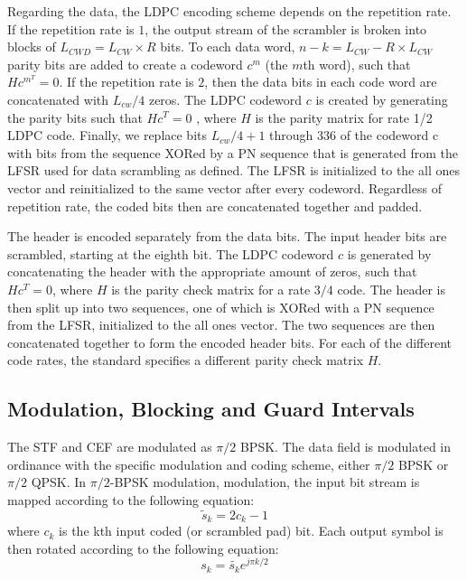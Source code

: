 \documentclass[conference]{IEEEtran}
\begin{document}
Regarding the data, the LDPC encoding scheme depends on the repetition rate. If the repetition rate is $1$, the output stream of the scrambler is broken into blocks of $L_{CWD} = L_{CW} \times R$ bits. To each data word, $n-k=L_{CW} - R \times L_{CW}$ parity bits are added to create a codeword $c^{m}$ (the $m$th word), such that $Hc^{m^{T}} = 0$. If the repetition rate is $2$, then the data bits in each code word are concatenated with $L_{cw}/4$ zeros. The LDPC codeword $c$ is created by generating the parity bits  such that $Hc^T = 0$ , where $H$ is the parity matrix
for rate 1/2 LDPC code. Finally, we replace bits $L_{cw}/4 + 1$ through 336 of the codeword c with bits from the sequence XORed by a PN sequence that is generated from the LFSR used for data
scrambling as defined. The LFSR is initialized to the all ones vector and reinitialized to the same vector after every codeword. Regardless of repetition rate, the coded bits then are concatenated together and padded. 

The header is encoded separately from the data bits. The input header bits are scrambled, starting at the eighth bit. The LDPC codeword $c$ is generated by concatenating the header with the appropriate amount of zeros, such that $Hc^T = 0$, where $H$ is the parity check matrix for a rate $3/4$ code. The header is then split up into two sequences, one of which is XORed with a PN sequence from the LFSR, initialized to the all ones vector. The two sequences are then concatenated together to form the encoded header bits. For each of the different code rates, the standard specifies a different parity check matrix $H$.

\subsection{Modulation, Blocking and Guard Intervals} 
The STF and CEF are modulated as $\pi/2$ BPSK. The data field is modulated in ordinance with the specific modulation and coding scheme, either $\pi/2$ BPSK or $\pi/2$ QPSK. 
In $\pi/2$-BPSK modulation, modulation, the input bit stream is mapped according to the following equation: \begin{equation}
\tilde{s}_k = 2c_k - 1
\end{equation}where $c_k$ is the kth input coded (or scrambled pad) bit. Each output symbol is then rotated according to the following equation: 
\begin{equation}
s_k = \tilde{s_k}e^{ j \pi  k / 2 }
\end{equation}
\end{document}
